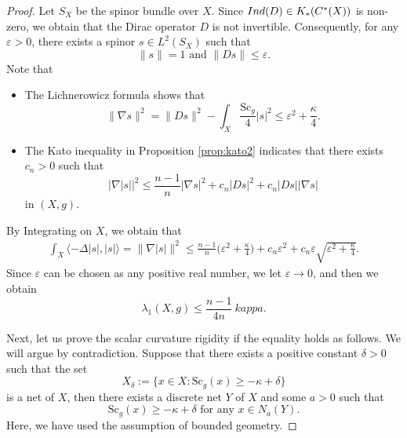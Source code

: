 \documentclass[12pt, reqno]{amsart}
\theoremstyle{plain}%
\theoremstyle{definition}
\theoremstyle{remark}
\numberwithin{equation}{section}
\newcommand{\Sc}{\mathrm{Sc}}
\newcommand{\ind}{\textup{Ind}}
\begin{document}
\begin{proof}
   	Let $S_{X}$ be the spinor bundle over $X$. Since $\ind(D)\in K_*(C^*(X))$ is non-zero, we obtain that the Dirac operator $D$ is not invertible.  Consequently, for any $\varepsilon>0$, there exists a spinor $s\in L^2(S_{X})$ such that
	$$\|s\|=1 \text{ and }\|Ds\|\leq\varepsilon.$$
	Note that
	\begin{itemize}
		\item  The Lichnerowicz formula shows that 
		$$\|\nabla s\|^2=\|D s\|^2-\int_{X}\frac{\Sc_{g}}{4}|s|^2\leq \varepsilon^2+\frac{\kappa}{4}.$$
		
		\item 	The  Kato inequality in Proposition \ref{prop:kato2} indicates that there exists $c_n>0$ such that
		$$\Big|\nabla|s|\Big|^2\leq \frac{n-1}{n}|\nabla s|^2+c_n|D s|^2+c_n|Ds||\nabla s|$$
		in $(X, {g})$.
	\end{itemize}
	By Integrating on $X$, we obtain that
	\begin{align*}
		\int_{X}\langle-\Delta |s|,|s|\rangle=\Big\|\nabla|s|\Big\|^2
		\leq \frac{n-1}{n}\big(\varepsilon^2+\frac{\kappa}{4}\big)+c_n\varepsilon^2+c_n\varepsilon\sqrt{\varepsilon^2+\frac{\kappa}{4}}.
	\end{align*}
	Since $\varepsilon$ can be chosen as any positive real number, we let $\varepsilon \rightarrow 0$, and then we obtain $$\lambda_1(X,g) \leq \frac{n-1}{4n}\ kappa.$$
	

	Next, let us prove the scalar curvature rigidity if the equality holds as follows. We will argue by contradiction. Suppose that there exists a positive constant $\delta>0$ such that the set $$X_\delta:=\{x\in X:\Sc_g(x)\geq -\kappa+\delta\}$$ is  a net of $X$, then there exists a discrete net $Y$ of $X$ and some $a>0$ such that
	$$\Sc_g(x)\geq -\kappa+\delta\text{ for any }x\in N_{a}(Y).$$
	Here, we have used the assumption of bounded geometry.
	

\end{proof}
\end{document}
